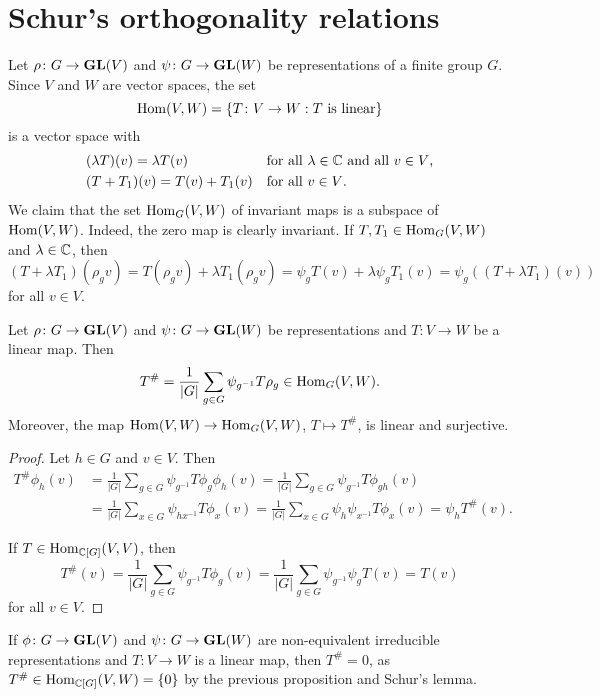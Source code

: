 \chapter{Schur's orthogonality relations}

Let $\rho\colon G\to\mathbf{GL}(V)$ and $\psi\colon G\to\mathbf{GL}(W)$ be representations of a finite group
$G$. Since $V$ and $W$ are vector spaces, the set 
\[
\operatorname{Hom}(V,W)=\{T\colon V\to W:\text{$T$ is linear}\}
\]
is a vector space with 
\begin{align*}
&(\lambda T)(v)=\lambda T(v) && \text{for all $\lambda\in\mathbb{C}$ and all $v\in V$,}\\ 
&(T+T_1)(v)=T(v)+T_1(v) &&\text{for all $v\in V$.}
\end{align*}
We claim that the set $\operatorname{Hom}_G(V,W)$ of invariant maps
is a subspace of $\operatorname{Hom}(V,W)$. Indeed, the zero map is clearly invariant. If $T,T_1\in\operatorname{Hom}_G(V,W)$ 
and $\lambda\in\mathbb{C}$, then
\[
(T+\lambda T_1)(\rho_g v)
=T(\rho_gv)+\lambda T_1(\rho_gv)
=\psi_gT(v)+\lambda \psi_gT_1(v)
=\psi_g((T+\lambda T_1)(v))
\]
for all $v\in V$. 
 
\begin{proposition}
	Let $\rho\colon G\to\mathbf{GL}(V)$ and $\psi\colon G\to\mathbf{GL}(W)$ be representations
	and $T\colon V\to W$ be a linear map. Then
	\[
	T^{\#}=\frac{1}{|G|}\sum_{g\in G}\psi_{g^{-1}}T\rho_g\in\operatorname{Hom}_G(V,W).
	\]
	Moreover, the map $\operatorname{Hom}(V,W)\to\operatorname{Hom}_G(V,W)$, $T\mapsto T^{\#}$, is linear and surjective.  
\end{proposition}

\begin{proof}
  Let $h\in G$ and $v\in V$. Then 
  \begin{align*}
	T^{\#}\phi_h(v)
	&=\frac{1}{|G|}\sum_{g\in G}\psi_{g^{-1}}T\phi_g\phi_h(v)
	=\frac{1}{|G|}\sum_{g\in G}\psi_{g^{-1}}T\phi_{gh}(v)\\
	&=\frac{1}{|G|}\sum_{x\in G}\psi_{hx^{-1}}T\phi_x(v)
	=\frac{1}{|G|}\sum_{x\in G}\psi_h\psi_{x^{-1}}T\phi_x(v)
	=\psi_hT^{\#}(v).
      \end{align*}

	  If $T\in\operatorname{Hom}_{\mathbb{C}[G]}(V,V)$, then 
      \[
	T^{\#}(v)=\frac{1}{|G|}\sum_{g\in G}\psi_{g^{-1}}T\phi_g(v)
	=\frac{1}{|G|}\sum_{g\in G}\psi_{g^{-1}}\psi_gT(v)
	=T(v)
      \]
      for all $v\in V$.
\end{proof}

If $\phi\colon G\to\mathbf{GL}(V)$ and $\psi\colon
	G\to\mathbf{GL}(W)$ are non-equivalent irreducible representations and $T\colon
	V\to W$ is a linear map, then $T^{\#}=0$, as 
	$T^{\#}\in\operatorname{Hom}_{\mathbb{C}[G]}(V,W)=\{0\}$ by the previous proposition and Schur's lemma.

